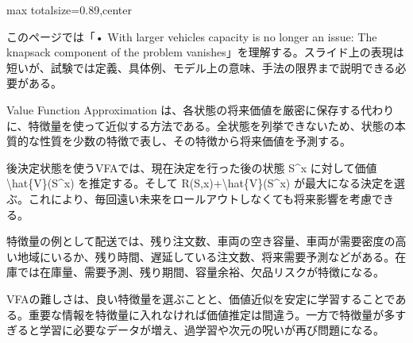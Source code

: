 \begin{minipage}[t]{0.58\textwidth}
\begin{adjustbox}{max totalsize={\textwidth}{0.89\textheight},center}
\begin{minipage}{\textwidth}\scriptsize
{}このページでは「• With larger vehicles capacity is no longer an issue: The knapsack component of the problem vanishes」を理解する。スライド上の表現は短いが、試験では定義、具体例、モデル上の意味、手法の限界まで説明できる必要がある。\par
Value Function Approximation は、各状態の将来価値を厳密に保存する代わりに、特徴量を使って近似する方法である。全状態を列挙できないため、状態の本質的な性質を少数の特徴で表し、その特徴から将来価値を予測する。\par
後決定状態を使うVFAでは、現在決定を行った後の状態 S\textasciicircum{}x に対して価値 \textbackslash{}hat\{V\}(S\textasciicircum{}x) を推定する。そして R(S,x)+\textbackslash{}hat\{V\}(S\textasciicircum{}x) が最大になる決定を選ぶ。これにより、毎回遠い未来をロールアウトしなくても将来影響を考慮できる。\par
特徴量の例として配送では、残り注文数、車両の空き容量、車両が需要密度の高い地域にいるか、残り時間、遅延している注文数、将来需要予測などがある。在庫では在庫量、需要予測、残り期間、容量余裕、欠品リスクが特徴になる。\par
VFAの難しさは、良い特徴量を選ぶことと、価値近似を安定に学習することである。重要な情報を特徴量に入れなければ価値推定は間違う。一方で特徴量が多すぎると学習に必要なデータが増え、過学習や次元の呪いが再び問題になる。\par

\end{minipage}
\end{adjustbox}
\end{minipage}

